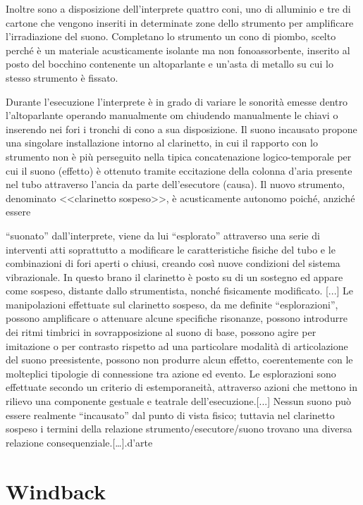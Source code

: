 Inoltre sono a disposizione dell’interprete quattro coni, uno di alluminio e tre
di cartone che vengono inseriti in determinate zone dello strumento per
amplificare l’irradiazione del suono.
Completano lo strumento un cono di piombo, scelto perché è un materiale
acusticamente isolante ma non fonoassorbente, inserito al posto del bocchino
contenente un altoparlante e un’asta di metallo su cui lo stesso strumento è
fissato.

Durante l’esecuzione l’interprete è in grado di variare le sonorità emesse
dentro l’altoparlante operando manualmente om chiudendo manualmente le chiavi o
inserendo nei fori i tronchi di cono a sua disposizione.
Il suono incausato propone una singolare installazione intorno al clarinetto, in
cui il rapporto con lo strumento non è più perseguito nella tipica concatenazione
logico-temporale per cui il suono (effetto) è ottenuto tramite eccitazione della
colonna d’aria presente nel tubo attraverso l’ancia da parte dell’esecutore
(causa). Il nuovo strumento, denominato <<clarinetto sospeso>>, è acusticamente
autonomo poiché, anziché essere

“suonato” dall’interprete, viene da lui “esplorato” attraverso una serie di
interventi atti soprattutto a modificare le caratteristiche fisiche del tubo e
le combinazioni di fori aperti o chiusi, creando così nuove condizioni del
sistema vibrazionale. In questo brano il clarinetto è posto su di un sostegno
ed appare come sospeso, distante dallo strumentista, nonché fisicamente
modificato. [...] Le manipolazioni effettuate sul clarinetto sospeso, da me
definite “esplorazioni”, possono amplificare o attenuare alcune specifiche
risonanze, possono introdurre dei ritmi timbrici in sovrapposizione al suono di
base, possono agire per imitazione o per contrasto rispetto ad una particolare
modalità di articolazione del suono preesistente, possono non produrre alcun
effetto, coerentemente con le molteplici tipologie di connessione tra azione ed
evento. Le esplorazioni sono effettuate secondo un criterio di estemporaneità,
attraverso azioni che mettono in rilievo una componente gestuale e teatrale
dell’esecuzione.[...]
Nessun suono può essere realmente “incausato” dal punto di vista fisico;
tuttavia nel clarinetto sospeso i termini della relazione strumento/esecutore/suono
trovano una diversa relazione consequenziale.[…].d’arte

\section{Windback}

